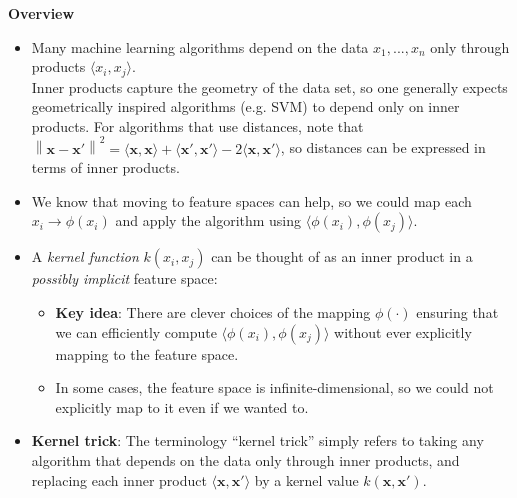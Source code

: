 \documentclass[twoside]{article}
\newcommand{\norm}[1]{\left\lVert #1 \right\rVert}
\begin{document}
\textbf{Overview}
\begin{itemize}
    \item Many machine learning algorithms depend on the data $x_1,...,x_n$ only through products $\langle x_i, x_j \rangle$.\\
    Inner products capture the geometry of the data set, so one generally expects geometrically inspired algorithms (e.g. SVM) to depend only on inner products. For algorithms that use distances, note that $\norm{\boldsymbol{x} - \boldsymbol{x'}}^2 = \langle \boldsymbol{x}, \boldsymbol{x} \rangle + \langle \boldsymbol{x'}, \boldsymbol{x'} \rangle - 2\langle \boldsymbol{x}, \boldsymbol{x'} \rangle$, so distances can be expressed in terms of inner products.
    \item We know that moving to feature spaces can help, so we could map each $x_i \rightarrow \phi(x_i)$ and apply the algorithm using $\langle \phi(x_i), \phi(x_j) \rangle$.
    \item A \textit{kernel function} $k(x_i, x_j)$ can be thought of as an inner product in a \textit{possibly implicit} feature space:
    \begin{itemize}
        \item \textbf{Key idea}: There are clever choices of the mapping $\phi(\cdot)$  ensuring that we can efficiently compute $\langle \phi(x_i), \phi(x_j) \rangle$ without ever explicitly mapping to the feature space.
        \item In some cases, the feature space is infinite-dimensional, so we could not explicitly map to it even if we wanted to.
    \end{itemize}
    \item \textbf{Kernel trick}: The terminology “kernel trick” simply refers to taking any algorithm that depends on the data only through inner products, and replacing each inner product $\langle \boldsymbol{x}, \boldsymbol{x'} \rangle$ by a kernel value $k(\boldsymbol{x}, \boldsymbol{x'})$.
\end{itemize}\medskip
\end{document}
